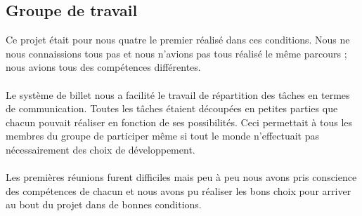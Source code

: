 \subsection{Groupe de travail}
Ce projet était pour nous quatre le premier réalisé dans ces conditions. Nous ne nous connaissions tous pas et nous n'avions pas tous réalisé le même parcours ; nous avions tous des compétences différentes.
\paragraph{}

Le système de billet nous a facilité le travail de répartition des tâches en termes de communication. Toutes les tâches étaient découpées en petites parties que chacun pouvait réaliser en fonction de ses possibilités. Ceci permettait à tous les membres du groupe de participer même si tout le monde n’effectuait pas nécessairement des choix de développement.
\paragraph{}

Les premières réunions furent difficiles mais peu à peu nous avons pris conscience des compétences de chacun et nous avons pu réaliser les bons choix pour arriver au bout du projet dans de bonnes conditions.




